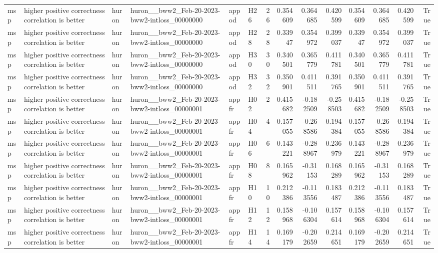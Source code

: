 \begin{longtable}{llllllrrrrrrrr}
msp & higher positive correctness correlation is better & huron & huron\_\_bww2\_Feb-20-2023-bww2-intloss\_00000000 & appod & H26 & 26 & 0.354609 & 0.364685 & 0.420599 & 0.354609 & 0.364685 & 0.420599 & True \\
msp & higher positive correctness correlation is better & huron & huron\_\_bww2\_Feb-20-2023-bww2-intloss\_00000000 & appod & H28 & 28 & 0.33947 & 0.354972 & 0.399037 & 0.33947 & 0.354972 & 0.399037 & True \\
msp & higher positive correctness correlation is better & huron & huron\_\_bww2\_Feb-20-2023-bww2-intloss\_00000000 & appod & H30 & 30 & 0.340501 & 0.365779 & 0.411781 & 0.340501 & 0.365779 & 0.411781 & True \\
msp & higher positive correctness correlation is better & huron & huron\_\_bww2\_Feb-20-2023-bww2-intloss\_00000000 & appod & H32 & 32 & 0.350901 & 0.411511 & 0.391765 & 0.350901 & 0.411511 & 0.391765 & True \\
msp & higher positive correctness correlation is better & huron & huron\_\_bww2\_Feb-20-2023-bww2-intloss\_00000001 & appfr & H02 & 2 & 0.415682 & -0.182509 & -0.258503 & 0.415682 & -0.182509 & -0.258503 & True \\
msp & higher positive correctness correlation is better & huron & huron\_\_bww2\_Feb-20-2023-bww2-intloss\_00000001 & appfr & H04 & 4 & 0.157055 & -0.268586 & 0.194384 & 0.157055 & -0.268586 & 0.194384 & True \\
msp & higher positive correctness correlation is better & huron & huron\_\_bww2\_Feb-20-2023-bww2-intloss\_00000001 & appfr & H06 & 6 & 0.143221 & -0.288967 & 0.236979 & 0.143221 & -0.288967 & 0.236979 & True \\
msp & higher positive correctness correlation is better & huron & huron\_\_bww2\_Feb-20-2023-bww2-intloss\_00000001 & appfr & H08 & 8 & 0.165962 & -0.31153 & 0.168289 & 0.165962 & -0.31153 & 0.168289 & True \\
msp & higher positive correctness correlation is better & huron & huron\_\_bww2\_Feb-20-2023-bww2-intloss\_00000001 & appfr & H10 & 10 & 0.212386 & -0.113556 & 0.183487 & 0.212386 & -0.113556 & 0.183487 & True \\
msp & higher positive correctness correlation is better & huron & huron\_\_bww2\_Feb-20-2023-bww2-intloss\_00000001 & appfr & H12 & 12 & 0.158968 & -0.106304 & 0.157614 & 0.158968 & -0.106304 & 0.157614 & True \\
msp & higher positive correctness correlation is better & huron & huron\_\_bww2\_Feb-20-2023-bww2-intloss\_00000001 & appfr & H14 & 14 & 0.169179 & -0.202659 & 0.214651 & 0.169179 & -0.202659 & 0.214651 & True \\

\end{longtable}
